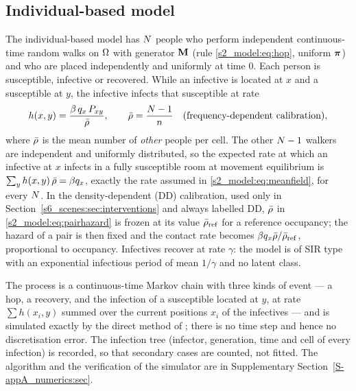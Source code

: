\subsection{Individual-based model}\label{s2_model:sec:ibm}

The individual-based model has $N$ people who perform independent continuous-time random walks on
$\Omega$ with generator $\mathbf{M}$ (rule \eqref{s2_model:eq:hop}, uniform $\boldsymbol{\pi}$) and who are placed
independently and uniformly at time $0$. Each person is susceptible, infective or recovered. While an
infective is located at $x$ and a susceptible at $y$, the infective infects that susceptible at rate
\begin{equation}\label{s2_model:eq:pairhazard}
  h(x,y)=\frac{\beta\,q_x\,P_{xy}}{\bar{\rho}},\qquad \bar{\rho}=\frac{N-1}{n}
  \quad(\text{frequency-dependent calibration}),
\end{equation}
where $\bar{\rho}$ is the mean number of \emph{other} people per cell. The other $N-1$ walkers are
independent and uniformly distributed, so the expected rate at which an infective at $x$ infects in a fully
susceptible room at movement equilibrium is $\sum_{y}h(x,y)\,\bar{\rho}=\beta q_x$, exactly the rate assumed in
\eqref{s2_model:eq:meanfield}, for every $N$. In the density-dependent (DD) calibration, used only in
Section~\ref{s6_scenes:sec:interventions} and always labelled DD, $\bar{\rho}$ in \eqref{s2_model:eq:pairhazard}
is frozen at its value $\bar{\rho}_{\mathrm{ref}}$ for a reference occupancy; the hazard of a pair is then fixed
and the contact rate becomes $\beta q_x\bar{\rho}/\bar{\rho}_{\mathrm{ref}}$, proportional to occupancy. Infectives
recover at rate $\gamma$: the model is of SIR type with an exponential infectious period of mean $1/\gamma$
and no latent class.

The process is a continuous-time Markov chain with three kinds of event --- a hop, a recovery, and the
infection of a susceptible located at $y$, at rate $\sum h(x_i,y)$ summed over the current positions $x_i$ of
the infectives --- and is simulated exactly by the direct method of
\citet{gillespie1976general,gillespie1977exact}; there is no time step and hence no discretisation error. The
infection tree (infector, generation, time and cell of every infection) is recorded, so that secondary cases
are counted, not fitted. The algorithm and the verification of the simulator are in Supplementary
Section~\ref{S-appA_numerics:sec}.

